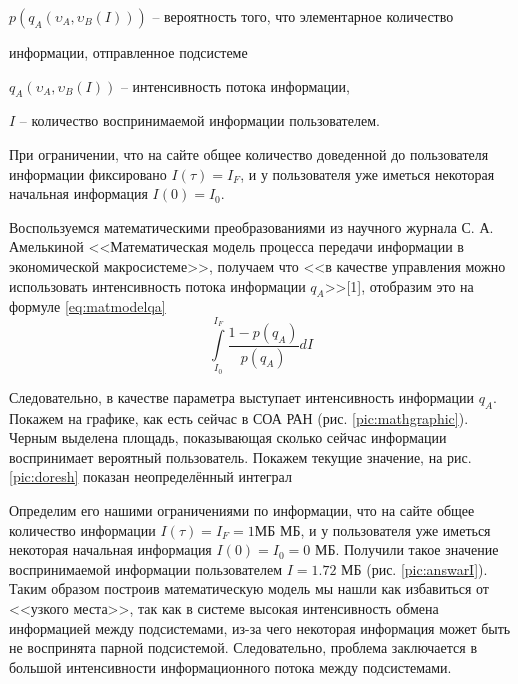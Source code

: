 $p\left( {q_A \left( {\upsilon _A ,\upsilon _B \left( I \right)} \right)} \right)$ -- вероятность того, что элементарное количество

информации, отправленное подсистеме %

$q_A \left( {\upsilon _A ,\upsilon _B \left( I \right)} \right)$ -- интенсивность потока информации,

$I$ -- количество воспринимаемой информации пользователем.

При ограничении, что на сайте общее количество доведенной до пользователя информации фиксировано $I\left( \tau  \right) = I_F$, и у пользователя уже иметься некоторая начальная информация $I\left( 0 \right) = I_0$. 

Воспользуемся математическими преобразованиями из научного журнала С. А. Амелькиной <<Математическая модель процесса передачи информации в экономической макросистеме>>, получаем что <<в качестве управления можно использовать интенсивность потока информации $q_A$>>[1], отобразим это на формуле \ref{eq:matmodelqa}
\begin{equation}\label{eq:matmodelqa}
\int\limits_{I_0 }^{I_F } {\frac{{1 - p(q_A )}}{{p(q_A )}}} dI
\end{equation}

Следовательно, в качестве параметра выступает интенсивность информации $q_A$. Покажем на графике, как есть сейчас в СОА РАН (рис. \ref{pic:mathgraphic}). 
Черным выделена площадь, показывающая сколько сейчас информации воспринимает вероятный пользователь. Покажем текущие значение, на рис. \ref{pic:doresh} показан неопределённый интеграл

Определим его нашими ограничениями по информации, что на сайте общее количество информации $I\left( \tau  \right) = I_F = 1 МБ$ МБ, и у пользователя уже иметься некоторая начальная информация $I\left( 0 \right) = I_0 = 0$ МБ. Получили такое значение воспринимаемой информации пользователем $I = 1.72$ МБ (рис. \ref{pic:answarI}). 
Таким образом построив математическую модель мы нашли как избавиться от <<узкого места>>, так как в системе высокая интенсивность обмена информацией между подсистемами, из-за чего некоторая информация может быть не воспринята парной подсистемой. Следовательно, проблема заключается в большой интенсивности информационного потока между подсистемами.

